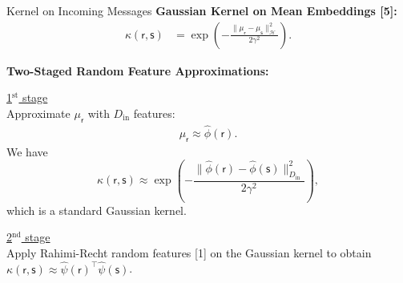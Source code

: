 \documentclass[english]{beamer}
\begin{document}
\begin{frame}
\begin{columns}[t]
\begin{block}{Kernel on Incoming Messages}
\textbf{Gaussian Kernel on Mean Embeddings [5]: }
\begin{align*}
\kappa(\mathsf{r}, \mathsf{s}) &= 
 \exp\left(-\frac{\|\mu_{\mathsf{r}}-\mu_{\mathsf{s}}\|_{\mathcal{H}}^{2}}{2\gamma^{2}}\right). 
\end{align*}

\textbf{Two-Staged Random Feature Approximations: }

\vspace*{5mm}
%
\underline{1$^{\text{st}}$ stage } \vspace{5mm} \\ 
Approximate $\mu_{\mathsf{r}}$ with $D_\mathrm{in}$ features:
%
\begin{align*}
    \mu_{\mathsf{r}} \approx \hat{\phi}(\mathsf{r}).
\end{align*}
%
We have
%
\begin{equation*}
\kappa(\mathsf{r},
\mathsf{s})\approx\exp\left(-\frac{\|\hat{\phi}(\mathsf{r})-\hat{\phi}(\mathsf{s})\|_{D_\mathrm{in}}^{2}}{2\gamma^{2}}\right),
%
\end{equation*}
%
which is a standard Gaussian kernel. 


\vspace{10mm}
\underline{2$^{\text{nd}}$ stage } \vspace{5mm} \\ 
Apply Rahimi-Recht random features [1] on the Gaussian kernel to obtain 
$\kappa(\mathsf{r}, \mathsf{s}) \approx \hat{\psi}(\mathsf{r})^\top
\hat{\psi}(\mathsf{s})$.


\end{block}
\end{columns}
\end{frame}
\end{document}
